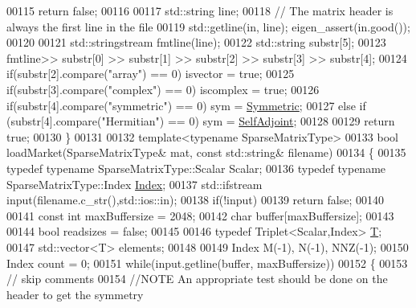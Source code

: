 \begin{DoxyCode}
{00115     \textcolor{keywordflow}{return} \textcolor{keyword}{false};
00116   
00117   std::string line; 
00118   \textcolor{comment}{// The matrix header is always the first line in the file }
00119   std::getline(in, line); eigen\_assert(in.good());
00120   
00121   std::stringstream fmtline(line); 
00122   std::string substr[5];
00123   fmtline>> substr[0] >> substr[1] >> substr[2] >> substr[3] >> substr[4];
00124   \textcolor{keywordflow}{if}(substr[2].compare(\textcolor{stringliteral}{"array"}) == 0) isvector = \textcolor{keyword}{true};
00125   \textcolor{keywordflow}{if}(substr[3].compare(\textcolor{stringliteral}{"complex"}) == 0) iscomplex = \textcolor{keyword}{true};
00126   \textcolor{keywordflow}{if}(substr[4].compare(\textcolor{stringliteral}{"symmetric"}) == 0) sym = \hyperlink{group__enums_gga39e3366ff5554d731e7dc8bb642f83cda7d30fb969ef6b763c098f0015108cef4}{Symmetric};
00127   \textcolor{keywordflow}{else} \textcolor{keywordflow}{if} (substr[4].compare(\textcolor{stringliteral}{"Hermitian"}) == 0) sym = \hyperlink{group__enums_gga39e3366ff5554d731e7dc8bb642f83cda2491fc6765056421f504eb7e16083e8f}{SelfAdjoint};
00128   
00129   \textcolor{keywordflow}{return} \textcolor{keyword}{true};
00130 \}
00131   
00132 \textcolor{keyword}{template}<\textcolor{keyword}{typename} SparseMatrixType>
00133 \textcolor{keywordtype}{bool} loadMarket(SparseMatrixType& mat, \textcolor{keyword}{const} std::string& filename)
00134 \{
00135   \textcolor{keyword}{typedef} \textcolor{keyword}{typename} SparseMatrixType::Scalar Scalar;
00136   \textcolor{keyword}{typedef} \textcolor{keyword}{typename} SparseMatrixType::Index \hyperlink{namespace_eigen_a62e77e0933482dafde8fe197d9a2cfde}{Index};
00137   std::ifstream input(filename.c\_str(),std::ios::in);
00138   \textcolor{keywordflow}{if}(!input)
00139     \textcolor{keywordflow}{return} \textcolor{keyword}{false};
00140   
00141   \textcolor{keyword}{const} \textcolor{keywordtype}{int} maxBuffersize = 2048;
00142   \textcolor{keywordtype}{char} buffer[maxBuffersize];
00143   
00144   \textcolor{keywordtype}{bool} readsizes = \textcolor{keyword}{false};
00145 
00146   \textcolor{keyword}{typedef} Triplet<Scalar,Index> \hyperlink{group___sparse_core___module_class_eigen_1_1_triplet}{T};
00147   std::vector<T> elements;
00148   
00149   Index M(-1), N(-1), NNZ(-1);
00150   Index count = 0;
00151   \textcolor{keywordflow}{while}(input.getline(buffer, maxBuffersize))
00152   \{
00153     \textcolor{comment}{// skip comments   }
00154     \textcolor{comment}{//NOTE An appropriate test should be done on the header to get the  symmetry}
}
\end{DoxyCode}
